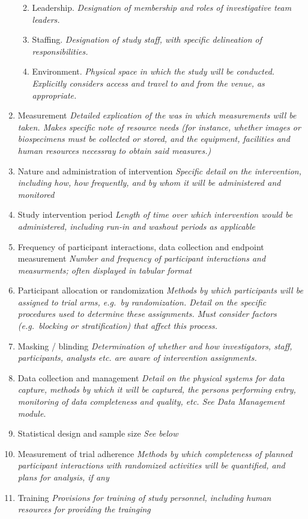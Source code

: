 \documentclass[]{book}
\providecommand{\tightlist}{%
  \setlength{\itemsep}{0pt}\setlength{\parskip}{0pt}}
\begin{document}
\begin{enumerate}
  \begin{enumerate}
  \def\labelenumii{\roman{enumii}.}
  \tightlist
  \item
    Leadership. \emph{Designation of membership and roles of
    investigative team leaders.}
  \item
    Staffing. \emph{Designation of study staff, with specific
    delineation of responsibilities.}
  \item
    Environment. \emph{Physical space in which the study will be
    conducted. Explicitly considers access and travel to and from the
    venue, as appropriate.}
  \end{enumerate}
\item
  Measurement \emph{Detailed explication of the was in which
  measurements will be taken. Makes specific note of resource needs (for
  instance, whether images or biospecimens must be collected or stored,
  and the equipment, facilities and human resources necessray to obtain
  said measures.)}
\item
  Nature and administration of intervention \emph{Specific detail on the
  intervention, including how, how frequently, and by whom it will be
  administered and monitored}
\item
  Study intervention period \emph{Length of time over which intervention
  would be administered, including run-in and washout periods as
  applicable}
\item
  Frequency of participant interactions, data collection and endpoint
  measurement \emph{Number and frequency of participant interactions and
  measurments; often displayed in tabular format}
\item
  Participant allocation or randomization \emph{Methods by which
  participants will be assigned to trial arms, e.g.~by randomization.
  Detail on the specific procedures used to determine these assignments.
  Must consider factors (e.g.~blocking or stratification) that affect
  this process.}
\item
  Masking / blinding \emph{Determination of whether and how
  investigators, staff, participants, analysts etc. are aware of
  intervention assignments.}
\item
  Data collection and management \emph{Detail on the physical systems
  for data capture, methods by which it will be captured, the persons
  performing entry, monitoring of data completeness and quality, etc.
  See Data Management module}.
\item
  Statistical design and sample size \emph{See below}
\item
  Measurement of trial adherence \emph{Methods by which completeness of
  planned participant interactions with randomized activities will be
  quantified, and plans for analysis, if any}
\item
  Training \emph{Provisions for training of study personnel, including
  human resources for providing the trainging}
\end{enumerate}
\end{document}
